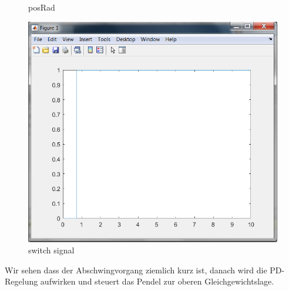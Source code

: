 \documentclass{article}
\begin{document}
\begin{figure}[h]
\begin{minipage}[b]{0.4\textwidth}
    \caption{posRad}
  \end{minipage}
  \hfill
  \begin{minipage}[b]{0.4\textwidth}
    \includegraphics[width=\textwidth]{switchSignal.PNG}
    \caption{switch signal}
  \end{minipage}
\end{figure}
Wir sehen dass der Abschwingvorgang ziemlich kurz ist, danach 
wird die PD-Regelung aufwirken und steuert das Pendel zur oberen
Gleichgewichtslage.
\end{document}
